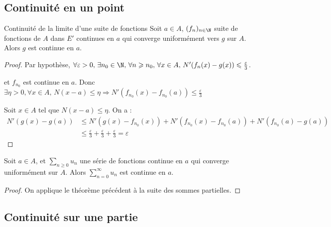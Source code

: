 \subsection{Continuité en un point }

\begin{proposition}{Continuité de la limite d'une suite de fonctions}{}
    Soit $a \in A$, $(f_n)_{n \in \N}$ suite de fonctions de $A$ dans $E'$ continues en $a$ qui converge 
    uniformément vers $g$ sur $A$. Alors $g$ est continue en $a$.
\end{proposition}


\begin{proof}
    Par hypothèse, $\forall \varepsilon > 0, \, \exists n_0 \in \N, \, \forall n \geqslant n_0, \, \forall x \in A, \, N'(f_n(x) - g(x)) \leqslant \frac \varepsilon 3$.

    et $f_{n_0}$ est continue en $a$. Donc $\exists \eta > 0, \forall x \in A, \, N(x - a) \leqslant \eta \Rightarrow N'(f_{n_0}(x) - f_{n_0}(a)) \leqslant \frac \varepsilon 3$

    Soit $x \in A$ tel que $N(x - a) \leqslant \eta$. On a :
    \begin{align}
        N'(g(x) - g(a)) & \leqslant N'(g(x) - f_{n_0}(x)) + N'(f_{n_0}(x) - f_{n_0}(a)) + N'(f_{n_0}(a) - g(a)) \\
        & \leqslant \frac \varepsilon 3 + \frac \varepsilon 3 + \frac \varepsilon 3 = \varepsilon
    \end{align}
\end{proof}

\begin{theoreme}{}{}
    Soit $a \in A$, et $\displaystyle \sum_{n \geqslant 0} u_n$ une série de fonctions continue en $a$ qui 
    converge uniformément sur $A$. Alors $\displaystyle \sum_{n = 0}^{\infty} u_n$ est continue en $a$.
\end{theoreme}

\begin{proof}
    On applique le théorème précédent à la suite des sommes partielles.
\end{proof}

\subsection{Continuité sur une partie }

